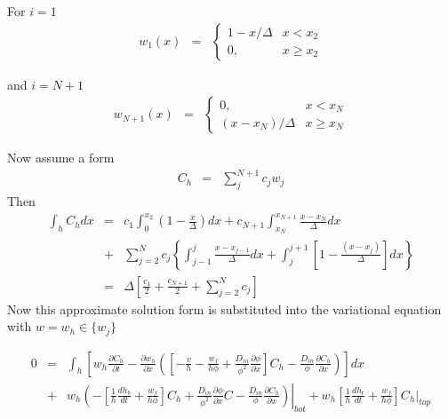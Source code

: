 For $i=1$
\begin{eqnarray}
w_1(x) & = & \left\{ \begin{array}{ll}
1 - x/\Delta & x < x_{2} \\
0, & x \geq x_{2}
\end{array}
\right.
\end{eqnarray}

and $i = N+1$
\begin{eqnarray}
w_{N+1}(x) & = & \left\{ \begin{array}{ll}
0, & x < x_{N} \\
(x-x_{N})/\Delta & x \geq x_{N}
\end{array}
\right.
\end{eqnarray}

Now assume a form
\begin{eqnarray}
C_h & = &  \sum_j^{N+1} c_j w_j
\end{eqnarray}
Then
\begin{eqnarray}
\int_h C_h dx & = & c_1\int_0^{x_{2}}\left(1-\frac{x}{\Delta}\right)dx
  +  c_{N+1}\int_{x_N}^{x_{N+1}}\frac{x-x_{N}}{\Delta}dx  \nonumber \\
& + &
  \sum_{j=2}^{N}c_j\left\{\int_{j-1}^{j}\frac{x-x_{j-1}}{\Delta}dx +
    \int_{j}^{j+1}\left[1 - \frac{(x-x_j)}{\Delta}\right]dx\right\}
  \nonumber \\
& = & \Delta \left[\frac{c_1}{2} + \frac{c_{N+1}}{2} + \sum_{j = 2}^{N}c_{j}\right]
\end{eqnarray}
Now this approximate solution form is substituted into the variational equation
with $w = w_h \in \{w_j\}$

\begin{eqnarray}
0 &= & \int_{h}\left[ w_h\frac{\partial C_h}{\partial t} -   \frac{\partial
    w_h}{\partial x} \left(\left[-\frac{v}{h} - \frac{w_f}{h\phi}+ \frac{D_{in}}{\phi^2}\frac{\partial
      \phi}{\partial x}\right]C_h  -  \frac{D_{in}}{\phi}\frac{\partial C_h}{\partial
      x} \right) \right]dx \nonumber \\
& + &  w_h\left.\left(
    -\left[\frac{1}{h}\frac{dh_b}{dt}+  \frac{w_f}{h\phi}\right]C_h + \frac{D_{in}}{\phi^2}\frac{\partial \phi}{\partial
    x}C -\frac{D_{in}}{\phi}\frac{\partial C_h}{\partial
    x}\right)\right|_{bot} + w_h\left[\frac{1}{h}\frac{dh_t}{dt} +
\frac{w_f}{h\phi}\right]C_h|_{top} \nonumber
\end{eqnarray}

